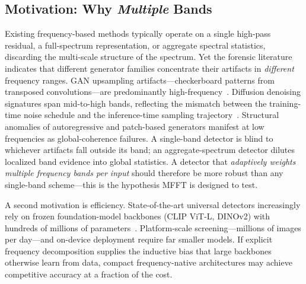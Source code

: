 \documentclass[journal]{IEEEtran}
\begin{document}
\subsection{Motivation: Why \emph{Multiple} Bands}
Existing frequency-based methods typically operate on a single high-pass residual, a full-spectrum representation, or aggregate spectral statistics, discarding the multi-scale structure of the spectrum. Yet the forensic literature indicates that different generator families concentrate their artifacts in \emph{different} frequency ranges. GAN upsampling artifacts---checkerboard patterns from transposed convolutions---are predominantly high-frequency~\cite{zhang2019wifs,durall2020}. Diffusion denoising signatures span mid-to-high bands, reflecting the mismatch between the training-time noise schedule and the inference-time sampling trajectory~\cite{corvi2023}. Structural anomalies of autoregressive and patch-based generators manifest at low frequencies as global-coherence failures. A single-band detector is blind to whichever artifacts fall outside its band; an aggregate-spectrum detector dilutes localized band evidence into global statistics. A detector that \emph{adaptively weights multiple frequency bands per input} should therefore be more robust than any single-band scheme---this is the hypothesis MFFT is designed to test.

A second motivation is efficiency. State-of-the-art universal detectors increasingly rely on frozen foundation-model backbones (CLIP ViT-L, DINOv2) with hundreds of millions of parameters~\cite{ojha2023}. Platform-scale screening---millions of images per day---and on-device deployment require far smaller models. If explicit frequency decomposition supplies the inductive bias that large backbones otherwise learn from data, compact frequency-native architectures may achieve competitive accuracy at a fraction of the cost.
\end{document}
